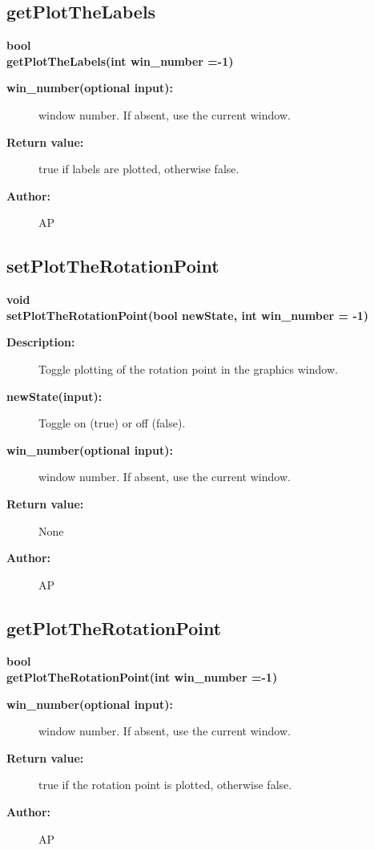 \subsection{getPlotTheLabels}
 
\begin{flushleft} \textbf{%
bool  \\ 
\settowidth{\GLGraphicsInterfaceIncludeArgIndent}{getPlotTheLabels(}%
getPlotTheLabels(int win\_number  =-1)
}\end{flushleft}
\begin{description}
\item[{\bf win\_number(optional input):}]  window number. If absent, use the current window.

\item[{\bf Return value:}]  true if labels are plotted, otherwise false.
\item[{\bf Author:}]  AP
\end{description}
\subsection{setPlotTheRotationPoint}
 
\begin{flushleft} \textbf{%
void  \\ 
\settowidth{\GLGraphicsInterfaceIncludeArgIndent}{setPlotTheRotationPoint(}%
setPlotTheRotationPoint(bool newState, int win\_number  = -1) 
}\end{flushleft}
\begin{description}
\item[{\bf Description:}] 
 Toggle plotting of the rotation point in the graphics window.
\item[{\bf newState(input):}]  Toggle on (true) or off (false).
\item[{\bf win\_number(optional input):}]  window number. If absent, use the current window.

\item[{\bf Return value:}]  None
\item[{\bf Author:}]  AP
\end{description}
\subsection{getPlotTheRotationPoint}
 
\begin{flushleft} \textbf{%
bool  \\ 
\settowidth{\GLGraphicsInterfaceIncludeArgIndent}{getPlotTheRotationPoint(}%
getPlotTheRotationPoint(int win\_number  =-1)
}\end{flushleft}
\begin{description}
\item[{\bf win\_number(optional input):}]  window number. If absent, use the current window.

\item[{\bf Return value:}]  true if the rotation point is plotted, otherwise false.
\item[{\bf Author:}]  AP
\end{description}
